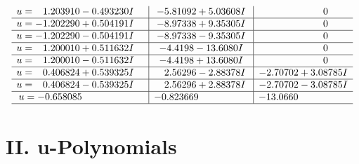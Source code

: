 \documentclass[1p]{elsarticle_modified}
\theoremstyle{definition}
\begin{document}
$$\begin{array}{c|c|c}
\begin{aligned}
u &= \phantom{-}1.203910 - 0.493230 I\end{aligned}
 & -5.81092 + 5.03608 I & \phantom{-0.000000 } 0 \\ \hline\begin{aligned}
u &= -1.202290 + 0.504191 I\end{aligned}
 & -8.97338 + 9.35305 I & \phantom{-0.000000 } 0 \\ \hline\begin{aligned}
u &= -1.202290 - 0.504191 I\end{aligned}
 & -8.97338 - 9.35305 I & \phantom{-0.000000 } 0 \\ \hline\begin{aligned}
u &= \phantom{-}1.200010 + 0.511632 I\end{aligned}
 & -4.4198 - 13.6080 I & \phantom{-0.000000 } 0 \\ \hline\begin{aligned}
u &= \phantom{-}1.200010 - 0.511632 I\end{aligned}
 & -4.4198 + 13.6080 I & \phantom{-0.000000 } 0 \\ \hline\begin{aligned}
u &= \phantom{-}0.406824 + 0.539325 I\end{aligned}
 & \phantom{-}2.56296 - 2.88378 I & -2.70702 + 3.08785 I \\ \hline\begin{aligned}
u &= \phantom{-}0.406824 - 0.539325 I\end{aligned}
 & \phantom{-}2.56296 + 2.88378 I & -2.70702 - 3.08785 I \\ \hline\begin{aligned}
u &= -0.658085\phantom{ +0.000000I}\end{aligned}
 & -0.823669\phantom{ +0.000000I} & -13.0660\phantom{ +0.000000I}\\
 \hline 
 \end{array}$$\newpage
\newpage\renewcommand{\arraystretch}{1}
\centering \section*{ II. u-Polynomials}
\end{document}
